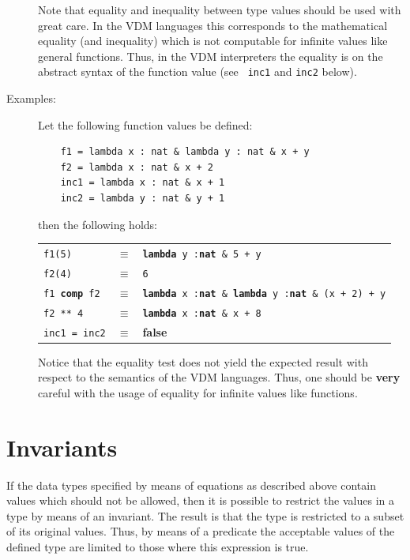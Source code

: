 \documentclass{overturerepchap}
\newcommand{\keyw}[1]{{\bf\ttfamily #1}}
\begin{document}
\begin{description}
  Note that equality and inequality between type values should be used
  with great care. In the VDM languages this corresponds to the
  mathematical equality (and inequality) which is not computable for
  infinite values like general functions. Thus, in the
  VDM interpreters the
  equality is on the abstract syntax of the function value (see {\tt
    inc1} and {\tt inc2} below).



\item[Examples:] Let the following function values be defined:
  \begin{lstlisting}
    f1 = lambda x : nat & lambda y : nat & x + y
    f2 = lambda x : nat & x + 2
    inc1 = lambda x : nat & x + 1
    inc2 = lambda y : nat & y + 1
  \end{lstlisting}
  then the following holds:
  
  \begin{tabular}{lcl}
    {\tt f1(5)} &$\equiv$& {\tt \keyw{lambda} y :\keyw{nat} \& 5 + y}\\
    {\tt f2(4)} &$\equiv$& {\tt 6}\\
    {\tt f1 \keyw{comp} f2}&$\equiv$& {\tt \keyw{lambda} x :\keyw{nat} \&
      \keyw{lambda} y :\keyw{nat} \& (x + 2) + y}\\
    {\tt f2 ** 4}&$\equiv$& {\tt \keyw{lambda} x :\keyw{nat} \& x + 8}\\
    {\tt inc1 = inc2}&$\equiv$& \keyw{false}\\
  \end{tabular}
  
  Notice that the equality test does not yield the expected result with
  respect to the semantics of the VDM languages. Thus, one should
  be {\bf very} careful with the usage of equality for infinite values
  like functions.
\end{description}

\section{Invariants}

If the data types specified by means of equations as described above
contain values which should not be allowed, then it is possible to restrict
the values in a type by means of an invariant. The result is that the type
is restricted to a subset of its original values. Thus, by means of a
predicate the acceptable values of the defined type are limited to those
where this expression is true.
\end{document}
